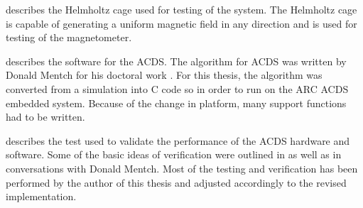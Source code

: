  describes the Helmholtz cage used for testing of the system. The Helmholtz cage is capable of generating a uniform magnetic field in any direction and is used for testing of the magnetometer.

 describes the software for the \ac{ACDS}. The algorithm for \ac{ACDS} was written by Donald Mentch for his doctoral work \cite{Mentch11}. For this thesis, the algorithm was converted from a \matlab simulation into C code so in order to run on the \ac{ARC} \ac{ACDS} embedded system. Because of the change in platform, many support functions had to be written.

 describes the test used to validate the performance of the ACDS hardware and software. Some of the basic ideas of verification were outlined in \cite{Mentch11} as well as in conversations with Donald Mentch. Most of the testing and verification has been performed by the author of this thesis and adjusted accordingly to the revised implementation.

